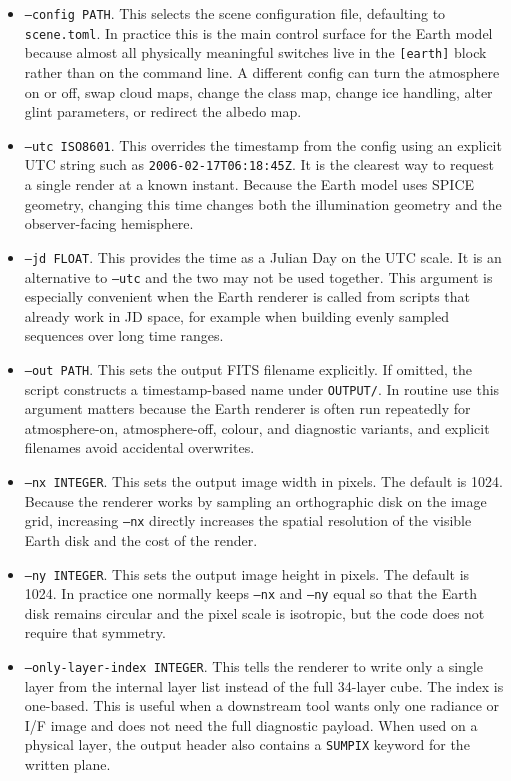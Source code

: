 \documentclass[12pt,a4paper]{article}
\begin{document}
\begin{itemize}
  \item \texttt{--config PATH}. This selects the scene configuration file, defaulting to \texttt{scene.toml}. In practice this is the main control surface for the Earth model because almost all physically meaningful switches live in the \texttt{[earth]} block rather than on the command line. A different config can turn the atmosphere on or off, swap cloud maps, change the class map, change ice handling, alter glint parameters, or redirect the albedo map.
  \item \texttt{--utc ISO8601}. This overrides the timestamp from the config using an explicit UTC string such as \texttt{2006-02-17T06:18:45Z}. It is the clearest way to request a single render at a known instant. Because the Earth model uses SPICE geometry, changing this time changes both the illumination geometry and the observer-facing hemisphere.
  \item \texttt{--jd FLOAT}. This provides the time as a Julian Day on the UTC scale. It is an alternative to \texttt{--utc} and the two may not be used together. This argument is especially convenient when the Earth renderer is called from scripts that already work in JD space, for example when building evenly sampled sequences over long time ranges.
  \item \texttt{--out PATH}. This sets the output FITS filename explicitly. If omitted, the script constructs a timestamp-based name under \texttt{OUTPUT/}. In routine use this argument matters because the Earth renderer is often run repeatedly for atmosphere-on, atmosphere-off, colour, and diagnostic variants, and explicit filenames avoid accidental overwrites.
  \item \texttt{--nx INTEGER}. This sets the output image width in pixels. The default is 1024. Because the renderer works by sampling an orthographic disk on the image grid, increasing \texttt{--nx} directly increases the spatial resolution of the visible Earth disk and the cost of the render.
  \item \texttt{--ny INTEGER}. This sets the output image height in pixels. The default is 1024. In practice one normally keeps \texttt{--nx} and \texttt{--ny} equal so that the Earth disk remains circular and the pixel scale is isotropic, but the code does not require that symmetry.
  \item \texttt{--only-layer-index INTEGER}. This tells the renderer to write only a single layer from the internal layer list instead of the full 34-layer cube. The index is one-based. This is useful when a downstream tool wants only one radiance or I/F image and does not need the full diagnostic payload. When used on a physical layer, the output header also contains a \texttt{SUMPIX} keyword for the written plane.

\end{itemize}
\end{document}
